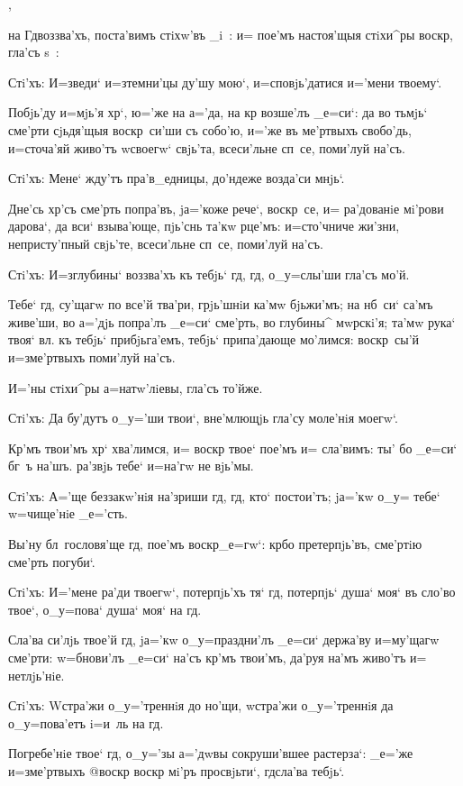 ,

на Гд воззва'хъ, поста'вимъ стiхw'въ _i~: и= пое'мъ 
настоя'щыя стiхи^ры воскр, гла'съ s~:

Стi'хъ: И=зведи` и=з\ъ темни'цы ду'шу мою`, 
и=сповjь'датися и='мени твоему`.

Побjь'ду и=мjь'я хр`, ю='же на а='да, на кр 
возше'лъ _е=си`: да во тьмjь` сме'рти сjьдя'щыя 
воскр~си'ши съ собо'ю, и='же въ ме'ртвыхъ свобо'дь, 
и=сточа'яй живо'тъ w\т своегw` свjь'та, всеси'льне сп~се, 
поми'луй на'съ.

Стi'хъ: Мене` жду'тъ пра'в_едницы, до'ндеже возда'си 
мнjь`. 

Дне'сь хр'съ сме'рть попра'въ, jа='коже рече`, 
воскр~се, и= ра'дованiе мi'рови дарова`, да вси` 
взыва'юще, пjь'снь та'кw рце'мъ: и=сто'чниче жи'зни, 
непристу'пный свjь'те, всеси'льне сп~се, поми'луй на'съ. 

Стi'хъ: И=з\ъ глубины` воззва'хъ къ тебjь` гд, 
гд, о_у=слы'ши гла'съ мо'й.

Тебе` гд, су'щагw по все'й тва'ри, грjь'шнiи ка'мw 
бjьжи'мъ; на нб~си` са'мъ живе'ши, во а='дjь попра'лъ 
_е=си` сме'рть, во глубины^ мwрскi'я; та'мw рука` твоя` 
вл. къ тебjь` прибjьга'емъ, тебjь` припа'дающе 
мо'лимся: воскр~сы'й и=з\ъ ме'ртвыхъ поми'луй на'съ. 

И='ны стiхи^ры а=натw'лiевы, гла'съ то'йже.

Стi'хъ: Да бу'дутъ о_у='ши твои`, вне'млющjь гла'су 
моле'нiя моегw`. 

Кр'мъ твои'мъ хр` хва'лимся, и= воскр 
твое` пое'мъ и= сла'вимъ: ты' бо _е=си` бг~ъ на'шъ. 
ра'звjь тебе` и=на'гw не вjь'мы.

Стi'хъ: А='ще беззакw'нiя на'зриши гд, гд, кто` 
постои'тъ; jа='кw о_у= тебе` w=чище'нiе _е='сть.

Вы'ну бл~гословя'ще гд, пое'мъ воскр _е=гw`: 
кр бо претерпjь'въ, сме'ртiю сме'рть погуби`.

Стi'хъ: И='мене ра'ди твоегw`, потерпjь'хъ тя` гд, 
потерпjь` душа` моя` въ сло'во твое`, о_у=пова` душа` 
моя` на гд.

Сла'ва си'лjь твое'й гд, jа='кw о_у=праздни'лъ 
_е=си` держа'ву и=му'щагw сме'рти: w=бнови'лъ _е=си` 
на'съ кр'мъ твои'мъ, да'руя на'мъ живо'тъ и= 
нетлjь'нiе.

Стi'хъ: W\т стра'жи о_у='треннiя до но'щи, w\т стра'жи 
о_у='треннiя да о_у=пова'етъ i=и~ль на гд.

Погребе'нiе твое` гд, о_у='зы а='дwвы сокруши'вшее 
растерза`: _е='же и=з\ъ ме'ртвыхъ @воскр 
{воскр} мi'ръ просвjьти`, гд сла'ва тебjь`.

